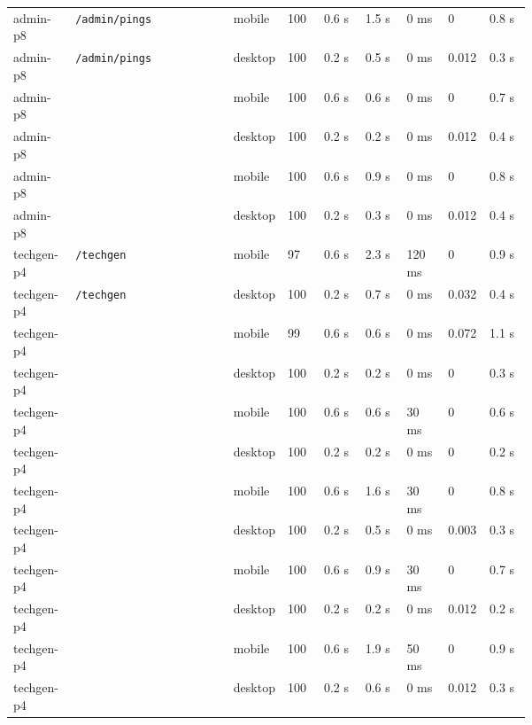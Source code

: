 \begin{landscape}
\begin{xltabular}{\linewidth}{p{0.12\linewidth} X p{0.09\linewidth} p{0.07\linewidth} p{0.08\linewidth} p{0.08\linewidth} p{0.08\linewidth} p{0.08\linewidth} p{0.08\linewidth}}
admin-p8 & \texttt{/admin/pings} & mobile & 100 & 0.6 s & 1.5 s & 0 ms & 0 & 0.8 s \\
admin-p8 & \texttt{/admin/pings} & desktop & 100 & 0.2 s & 0.5 s & 0 ms & 0.012 & 0.3 s \\

admin-p8 &  & mobile & 100 & 0.6 s & 0.6 s & 0 ms & 0 & 0.7 s \\
admin-p8 &  & desktop & 100 & 0.2 s & 0.2 s & 0 ms & 0.012 & 0.4 s \\

admin-p8 &  & mobile & 100 & 0.6 s & 0.9 s & 0 ms & 0 & 0.8 s \\
admin-p8 &  & desktop & 100 & 0.2 s & 0.3 s & 0 ms & 0.012 & 0.4 s \\

techgen-p4 & \texttt{/techgen} & mobile & 97 & 0.6 s & 2.3 s & 120 ms & 0 & 0.9 s \\
techgen-p4 & \texttt{/techgen} & desktop & 100 & 0.2 s & 0.7 s & 0 ms & 0.032 & 0.4 s \\

techgen-p4 &  & mobile & 99 & 0.6 s & 0.6 s & 0 ms & 0.072 & 1.1 s \\
techgen-p4 &  & desktop & 100 & 0.2 s & 0.2 s & 0 ms & 0 & 0.3 s \\

techgen-p4 &  & mobile & 100 & 0.6 s & 0.6 s & 30 ms & 0 & 0.6 s \\
techgen-p4 &  & desktop & 100 & 0.2 s & 0.2 s & 0 ms & 0 & 0.2 s \\

techgen-p4 &  & mobile & 100 & 0.6 s & 1.6 s & 30 ms & 0 & 0.8 s \\
techgen-p4 &  & desktop & 100 & 0.2 s & 0.5 s & 0 ms & 0.003 & 0.3 s \\

techgen-p4 &  & mobile & 100 & 0.6 s & 0.9 s & 30 ms & 0 & 0.7 s \\
techgen-p4 &  & desktop & 100 & 0.2 s & 0.2 s & 0 ms & 0.012 & 0.2 s \\

techgen-p4 &  & mobile & 100 & 0.6 s & 1.9 s & 50 ms & 0 & 0.9 s \\
techgen-p4 &  & desktop & 100 & 0.2 s & 0.6 s & 0 ms & 0.012 & 0.3 s \\


\end{xltabular}
\end{landscape}
